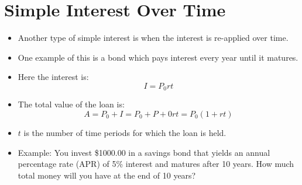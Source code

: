 \documentclass{article}
\begin{document}
\section*{Simple Interest Over Time}
\begin{itemize}
    \item Another type of simple interest is when the interest is
        re-applied over time.
    \item One example of this is a bond which pays interest every year
        until it matures.
    \item Here the interest is:
    \[
    I = P_0rt
    \]

    \item The total value of the loan is:
    \[
        A = P_0 + I = P_0+P+0rt = P_0(1+rt)
    \]

    \item $t$ is the number of time periods for which the loan is held.

    \item Example: You invest \$1000.00 in a savings bond that yields
    an annual percentage rate (APR) of 5\% interest and matures after
    10 years.  How much total money will  you have at the end of 10
    years?
\end{itemize}
\end{document}
